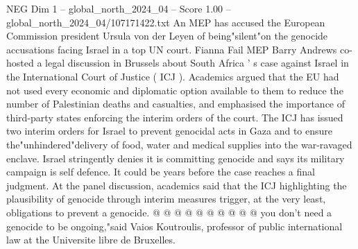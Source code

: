 \begin{textsample}{NEG Dim 1 – global\_north\_2024\_04 – Score 1.00 – global\_north\_2024\_04/107171422.txt}  \label{ex:f1_neg_303}
An MEP has accused the European Commission president Ursula von der Leyen of being"silent"on the genocide accusations facing Israel in a top UN court.
Fianna Fail MEP Barry Andrews co-hosted a legal discussion in Brussels about South Africa ' s case against Israel in the International Court of Justice ( ICJ ).
Academics argued that the EU had not used every economic and diplomatic option available to them to reduce the number of Palestinian deaths and casualties, and emphasised the importance of third-party states enforcing the interim orders of the court.
The ICJ has issued two interim orders for Israel to prevent genocidal acts in Gaza and to ensure the"unhindered"delivery of food, water and medical supplies into the war-ravaged enclave.
Israel stringently denies it is committing genocide and says its military campaign is self defence.
It could be years before the case reaches a final judgment.
At the panel discussion, academics said that the ICJ highlighting the plausibility of genocide through interim measures trigger, at the very least, obligations to prevent a genocide. @ @ @ @ @ @ @ @ @ @ you don't need a genocide to be ongoing,"said Vaios Koutroulis, professor of public international law at the Universite libre de Bruxelles.

\end{textsample}
